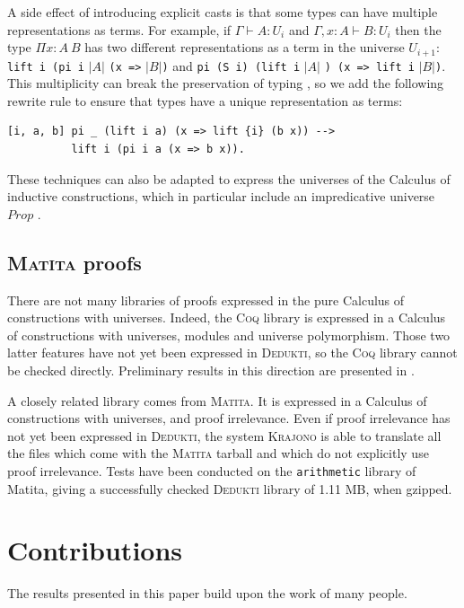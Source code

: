 \documentclass[english]{lipics}
\newcommand\lst[1]{{\rm \lstinline{#1}}}
\begin{document}
A side effect of introducing explicit casts is that some types can
have multiple representations as terms. For example, if $\Gamma \vdash
A : U_i$ and $\Gamma, x:A \vdash B : U_i$ then the type $\Pi x:A~B$
has two different representations as a term in the universe $U_{i+1}$:
\lst{lift i (pi i} $|A|$ \lst{(x =>} $|B|$\lst{)} and
\lst{pi (S i) (lift i} $|A|$ \lst{) (x => lift i} $|B|$\lst{)}.
This
multiplicity can break the preservation of typing \cite{Assaf2014}, so
we add the following rewrite rule to ensure that types have a unique
representation as terms:
\begin{lstlisting}
[i, a, b] pi _ (lift i a) (x => lift {i} (b x)) -->
          lift i (pi i a (x => b x)).
\end{lstlisting}

These techniques can also be adapted to express the universes of the
Calculus of inductive constructions, which in particular include an
impredicative universe $Prop$ \cite{Assaf2014}.

\subsection{\textsc{Matita} proofs}

There are not many libraries of proofs expressed in the pure Calculus of
constructions with universes. Indeed, the \textsc{Coq} library is
expressed in a Calculus of constructions with universes, modules and
universe polymorphism. Those two latter features have not yet been
expressed in \textsc{Dedukti}, so the \textsc{Coq} library cannot be
checked directly. Preliminary results in this direction are
presented in \cite{Jouannaud}.

A closely related library comes from \textsc{Matita}. It is expressed
in a Calculus of constructions with universes, and proof irrelevance.
Even if proof irrelevance has not yet been expressed in
\textsc{Dedukti}, the system \textsc{Krajono} is able to translate all
the files which come with the \textsc{Matita} tarball and which do not
explicitly use proof irrelevance. Tests have been conducted on the
\texttt{arithmetic} library of Matita, giving a successfully checked
\textsc{Dedukti} library of 1.11 MB, when gzipped.

\section{Contributions}

The results presented in this paper build upon the work of many people.
\end{document}
